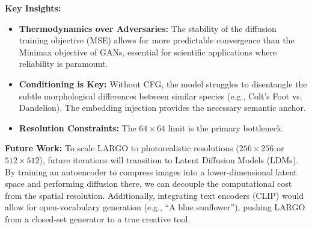 \documentclass[12pt, a4paper]{article}
\begin{document}
\textbf{Key Insights:}
\begin{itemize}
    \item \textbf{Thermodynamics over Adversaries:} The stability of the diffusion training objective (MSE) allows for more predictable convergence than the Minimax objective of GANs, essential for scientific applications where reliability is paramount.
    \item \textbf{Conditioning is Key:} Without CFG, the model struggles to disentangle the subtle morphological differences between similar species (e.g., Colt's Foot vs. Dandelion). The embedding injection provides the necessary semantic anchor.
    \item \textbf{Resolution Constraints:} The $64 \times 64$ limit is the primary bottleneck.
\end{itemize}

\textbf{Future Work:} To scale LARGO to photorealistic resolutions ($256 \times 256$ or $512 \times 512$), future iterations will transition to Latent Diffusion Models (LDMs). By training an autoencoder to compress images into a lower-dimensional latent space and performing diffusion there, we can decouple the computational cost from the spatial resolution. Additionally, integrating text encoders (CLIP) would allow for open-vocabulary generation (e.g., ``A blue sunflower''), pushing LARGO from a closed-set generator to a true creative tool.
\end{document}

